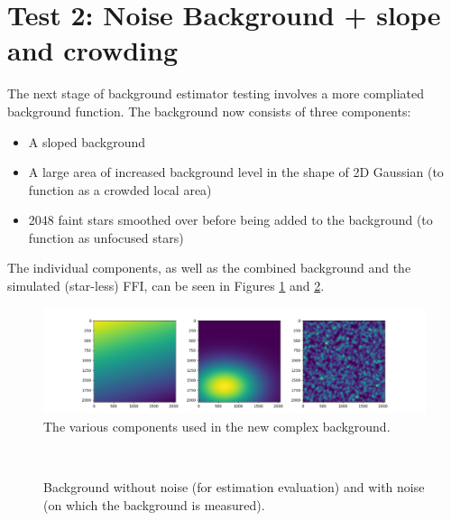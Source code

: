 \documentclass[10pt, a4paper]{article}
\begin{document}
\clearpage


\section{Test 2: Noise Background + slope and crowding}
The next stage of background estimator testing involves a more compliated background function. The background now consists of three components:

\begin{itemize}
\item A sloped background
\item A large area of increased background level in the shape of 2D Gaussian (to function as a crowded local area)
\item 2048 faint stars smoothed over before being added to the background (to function as unfocused stars)
\end{itemize}

The individual components, as well as the combined background and the simulated (star-less) FFI, can be seen in Figures \ref{fig:bkgcomponents} and \ref{fig:complexbkg}.

\begin{figure}[h!]
\centering
\includegraphics[width=\textwidth]{bkgcomponents}
\caption{The various components used in the new complex background.}
\label{fig:bkgcomponents}
\end{figure}


\begin{figure}[h!]
   \centering
   \quad
   \\
   \caption{Background without noise (for estimation evaluation) and with noise (on which the background is measured).}
   \label{fig:complexbkg}
\end{figure}
\end{document}
